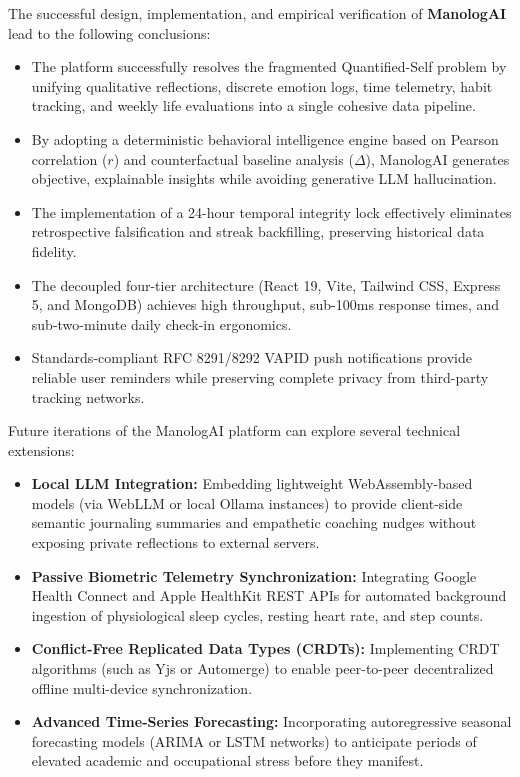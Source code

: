 The successful design, implementation, and empirical verification of \textbf{ManologAI} lead to the following conclusions:
\begin{itemize}
  \item The platform successfully resolves the fragmented Quantified-Self problem by unifying qualitative reflections, discrete emotion logs, time telemetry, habit tracking, and weekly life evaluations into a single cohesive data pipeline.
  \item By adopting a deterministic behavioral intelligence engine based on Pearson correlation ($r$) and counterfactual baseline analysis ($\Delta$), ManologAI generates objective, explainable insights while avoiding generative LLM hallucination.
  \item The implementation of a 24-hour temporal integrity lock effectively eliminates retrospective falsification and streak backfilling, preserving historical data fidelity.
  \item The decoupled four-tier architecture (React 19, Vite, Tailwind CSS, Express 5, and MongoDB) achieves high throughput, sub-100ms response times, and sub-two-minute daily check-in ergonomics.
  \item Standards-compliant RFC 8291/8292 VAPID push notifications provide reliable user reminders while preserving complete privacy from third-party tracking networks.
\end{itemize}

Future iterations of the ManologAI platform can explore several technical extensions:
\begin{itemize}
  \item \textbf{Local LLM Integration:} Embedding lightweight Web\-Assembly-based models (via WebLLM or local Ollama instances) to provide client-side semantic journaling summaries and empathetic coaching nudges without exposing private reflections to external servers.
  \item \textbf{Passive Biometric Telemetry Synchronization:} Integrating Google Health Connect and Apple HealthKit REST APIs for automated background ingestion of physiological sleep cycles, resting heart rate, and step counts.
  \item \textbf{Conflict-Free Replicated Data Types (CRDTs):} Implementing CRDT algorithms (such as Yjs or Automerge) to enable peer-to-peer decentralized offline multi-device synchronization.
  \item \textbf{Advanced Time-Series Forecasting:} Incorporating autoregressive seasonal forecasting models (ARIMA or LSTM networks) to anticipate periods of elevated academic and occupational stress before they manifest.
\end{itemize}
